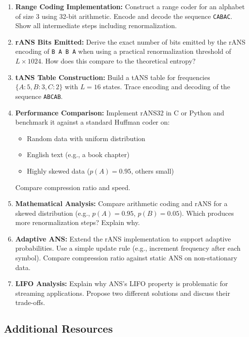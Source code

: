 \begin{enumerate}
    \item \textbf{Range Coding Implementation:} Construct a range coder for an alphabet of size 3 using 32-bit arithmetic. Encode and decode the sequence \texttt{CABAC}. Show all intermediate steps including renormalization.
    
    \item \textbf{rANS Bits Emitted:} Derive the exact number of bits emitted by the rANS encoding of \texttt{B A B A} when using a practical renormalization threshold of $L \times 1024$. How does this compare to the theoretical entropy?
    
    \item \textbf{tANS Table Construction:} Build a tANS table for frequencies $\{A:5, B:3, C:2\}$ with $L=16$ states. Trace encoding and decoding of the sequence \texttt{ABCAB}.
    
    \item \textbf{Performance Comparison:} Implement rANS32 in C or Python and benchmark it against a standard Huffman coder on:
    \begin{itemize}
        \item Random data with uniform distribution
        \item English text (e.g., a book chapter)
        \item Highly skewed data ($p(A)=0.95$, others small)
    \end{itemize}
    Compare compression ratio and speed.
    
    \item \textbf{Mathematical Analysis:} Compare arithmetic coding and rANS for a skewed distribution (e.g., $p(A)=0.95$, $p(B)=0.05$). Which produces more renormalization steps? Explain why.
    
    \item \textbf{Adaptive ANS:} Extend the rANS implementation to support adaptive probabilities. Use a simple update rule (e.g., increment frequency after each symbol). Compare compression ratio against static ANS on non-stationary data.
    
    \item \textbf{LIFO Analysis:} Explain why ANS's LIFO property is problematic for streaming applications. Propose two different solutions and discuss their trade-offs.
\end{enumerate}

\subsection*{Additional Resources}

